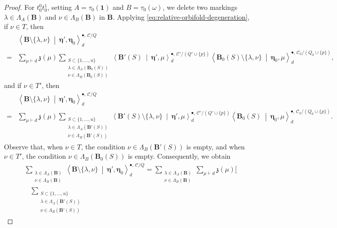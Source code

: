 \documentclass[letterpaper,12pt]{amsart}
\theoremstyle{definition}
\newcommand{\id}{\mathbf 1}
\newcommand{\cC}{\mathcal C}
\numberwithin{equation}{section}
\begin{document}
\begin{proof}
For $t^0_0t^1_0$, setting $A=\tau_0(\id)$ and $B=\tau_0(\omega)$, we delete two markings $\lambda\in\Lambda_A(\mathbf B)$ and $\nu\in\Lambda_B(\mathbf B)$ in $\mathbf B$. Applying \eqref{eq:relative-orbifold-degeneration}, if $\nu\in T$, then
\[
\begin{aligned}
 &\left\langle\mathbf B\setminus\{\lambda,\nu\}
 \ \middle|\ \boldsymbol\eta',\boldsymbol\eta_0\right\rangle_d^{\bullet,\,\cC/Q}
\\
={}&\sum_{\mu\vdash d}\mathfrak z(\mu)
\sum_{\substack{S\subset\{1,\ldots,u\}\\\lambda\in\Lambda_A(\mathbf B_0(S))\\\nu\in\Lambda_B(\mathbf B_0(S))}}
 \left\langle\mathbf B'(S)\ \middle|\ \boldsymbol\eta',\mu\right\rangle_d^{\bullet,\,\cC'/(Q'\cup\{p\})}
 \left\langle\mathbf B_0(S)\setminus\{\lambda,\nu\}
 \ \middle|\ \boldsymbol\eta_0,\mu\right\rangle_d^{\bullet,\,\cC_0/(Q_0\cup\{p\})},
\end{aligned}
\]
and if $\nu\in T'$, then
\[
\begin{aligned}
&\left\langle\mathbf B\setminus\{\lambda,\nu\}
 \ \middle|\ \boldsymbol\eta',\boldsymbol\eta_0\right\rangle_d^{\bullet,\,\cC/Q}
\\
={}&\sum_{\mu\vdash d}\mathfrak z(\mu)
 \sum_{\substack{S\subset\{1,\ldots,u\}\\\lambda\in\Lambda_A(\mathbf B'(S))\\\nu\in\Lambda_B(\mathbf B'(S))}}
 \left\langle\mathbf B'(S)\setminus\{\lambda,\nu\}
 \ \middle|\ \boldsymbol\eta',\mu\right\rangle_d^{\bullet,\,\cC'/(Q'\cup\{p\})}
 \left\langle\mathbf B_0(S)\ \middle|\ \boldsymbol\eta_0,\mu\right\rangle_d^{\bullet,\,\cC_0/(Q_0\cup\{p\})}.
\end{aligned}
\]
Observe that, when $\nu\in T$, the condition $\nu\in\Lambda_B(\mathbf B'(S))$ is empty, and when $\nu\in T'$, the condition $\nu\in\Lambda_B(\mathbf B_0(S))$ is empty. Consequently, we obtain
\[
\begin{aligned}
&\sum_{\substack{\lambda\in\Lambda_A(\mathbf B)\\\nu\in\Lambda_B(\mathbf B)}}
 \left\langle\mathbf B\setminus\{\lambda,\nu\}
 \ \middle|\ \boldsymbol\eta',\boldsymbol\eta_0\right\rangle_d^{\bullet,\,\cC/Q}
={}\sum_{\substack{\lambda\in\Lambda_A(\mathbf B)\\\nu\in\Lambda_B(\mathbf B)}}\sum_{\mu\vdash d}\mathfrak z(\mu)\Bigg[
\\[-2mm]
&\quad
 \sum_{\substack{S\subset\{1,\ldots,u\}\\\lambda\in\Lambda_A(\mathbf B'(S))\\\nu\in\Lambda_B(\mathbf B'(S))}}

\end{aligned}\]
\end{proof}
\end{document}
